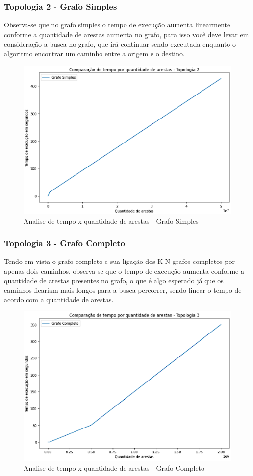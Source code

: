 \subsubsection{Topologia 2 - Grafo Simples}

Observa-se que no grafo simples o tempo de execução aumenta linearmente conforme a quantidade de arestas aumenta no grafo, para isso você deve levar em consideração a busca no grafo, que irá continuar sendo executada enquanto o algoritmo encontrar um caminho entre a origem e o destino.

\begin{figure}[ht]
    \centering
    \includegraphics[width=.6\textwidth]{figuras/simples.png}
    \caption{Analise de tempo x quantidade de arestas - Grafo Simples}
    \label{fig:figure30}
\end{figure}

\subsubsection{Topologia 3 - Grafo Completo}

Tendo em vista o grafo completo e sua ligação dos K-N grafos completos por apenas dois caminhos, observa-se que o tempo de execução aumenta conforme a quantidade de arestas presentes no grafo, o que é algo esperado já que os caminhos ficariam mais longos para a busca percorrer, sendo linear o tempo de acordo com a quantidade de arestas.

\begin{figure}[ht]
    \centering
    \includegraphics[width=.6\textwidth]{figuras/completo.png}
    \caption{Analise de tempo x quantidade de arestas - Grafo Completo}
    \label{fig:figure40}
\end{figure}

